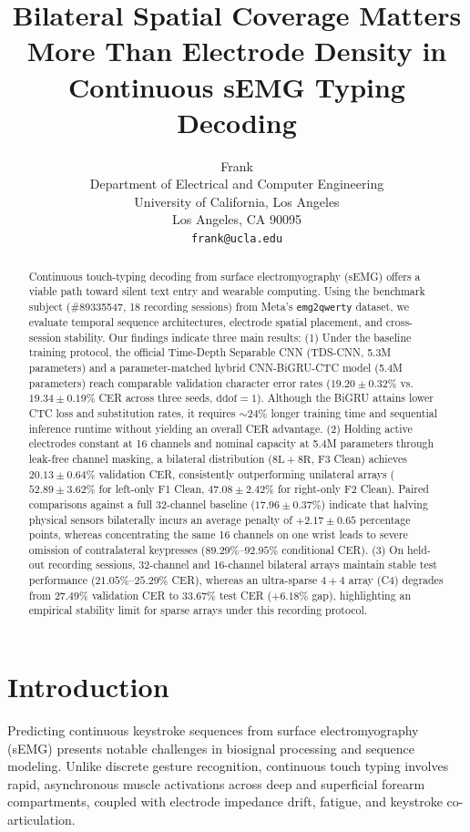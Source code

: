 \documentclass{article}
\title{Bilateral Spatial Coverage Matters More Than Electrode Density in Continuous sEMG Typing Decoding}
\author{
  Frank \\
  Department of Electrical and Computer Engineering\\
  University of California, Los Angeles\\
  Los Angeles, CA 90095 \\
  \texttt{frank@ucla.edu} \\
}
\begin{document}
\maketitle

\begin{abstract}
Continuous touch-typing decoding from surface electromyography (sEMG) offers a viable path toward silent text entry and wearable computing. Using the benchmark subject (\#89335547, 18 recording sessions) from Meta's \texttt{emg2qwerty} dataset, we evaluate temporal sequence architectures, electrode spatial placement, and cross-session stability. Our findings indicate three main results:
(1) Under the baseline training protocol, the official Time-Depth Separable CNN (TDS-CNN, 5.3M parameters) and a parameter-matched hybrid CNN-BiGRU-CTC model (5.4M parameters) reach comparable validation character error rates ($19.20 \pm 0.32\%$ vs.\ $19.34 \pm 0.19\%$ CER across three seeds, $\text{ddof}=1$). Although the BiGRU attains lower CTC loss and substitution rates, it requires $\sim 24\%$ longer training time and sequential inference runtime without yielding an overall CER advantage.
(2) Holding active electrodes constant at 16 channels and nominal capacity at 5.4M parameters through leak-free channel masking, a bilateral distribution ($8\text{L}+8\text{R}$, F3 Clean) achieves $20.13 \pm 0.64\%$ validation CER, consistently outperforming unilateral arrays ($52.89 \pm 3.62\%$ for left-only F1 Clean, $47.08 \pm 2.42\%$ for right-only F2 Clean). Paired comparisons against a full 32-channel baseline ($17.96 \pm 0.37\%$) indicate that halving physical sensors bilaterally incurs an average penalty of $+2.17 \pm 0.65$ percentage points, whereas concentrating the same 16 channels on one wrist leads to severe omission of contralateral keypresses ($89.29\%$--$92.95\%$ conditional CER).
(3) On held-out recording sessions, 32-channel and 16-channel bilateral arrays maintain stable test performance ($21.05\%$--$25.29\%$ CER), whereas an ultra-sparse $4+4$ array (C4) degrades from $27.49\%$ validation CER to $33.67\%$ test CER ($+6.18\%$ gap), highlighting an empirical stability limit for sparse arrays under this recording protocol.
\end{abstract}

\section{Introduction}
\label{sec:intro}

Predicting continuous keystroke sequences from surface electromyography (sEMG) presents notable challenges in biosignal processing and sequence modeling. Unlike discrete gesture recognition, continuous touch typing involves rapid, asynchronous muscle activations across deep and superficial forearm compartments, coupled with electrode impedance drift, fatigue, and keystroke co-articulation.
\end{document}
